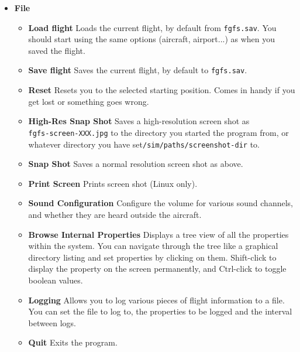 \begin{itemize}
 \item \textbf{File}
 \begin{itemize}
 \item \textbf{Load flight} Loads the current flight, by
default from \texttt{fgfs.sav}. You should
start \FlightGear{} using the same options (aircraft, airport...) as when you
saved the flight.
  \item \textbf{Save flight} Saves the current flight, by
default to \texttt{fgfs.sav}.
 \item \textbf{Reset} Resets you to the selected starting
position.
 Comes in handy if you get lost or something goes wrong.
  \item \textbf{High-Res Snap Shot} Saves a high-resolution screen
shot as \\ \texttt{fgfs-screen-XXX.jpg} to
  the directory you started the program from, or whatever
directory you have set\texttt{/sim/paths/screenshot-dir} to.
  \item \textbf{Snap Shot} Saves a normal resolution screen
shot as above.
  \item \textbf{Print Screen} Prints screen shot (Linux only).
  \item \textbf{Sound Configuration} Configure the volume for various sound
channels, and whether they are heard outside the aircraft.
  \item \textbf{Browse Internal Properties} Displays a tree view of all the
properties within the system.
  You can navigate through the tree like a graphical directory listing and set
properties by clicking on them. Shift-click to display the property on the screen
permanently, and Ctrl-click to toggle boolean values.
  \item \textbf{Logging} Allows you to log various pieces of flight information
to a file.
  You can set the file to log to, the properties to be logged and the interval
between logs.
  \item \textbf{Quit} Exits the program.
 \end{itemize}


\end{itemize}
